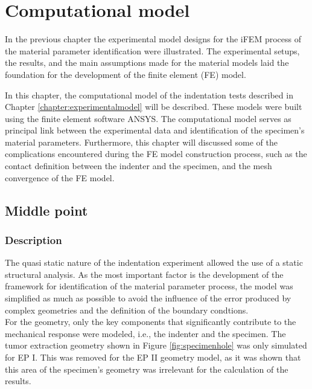 
\chapter{Computational model} %
\label{chapter:computationalmodel} %

In the previous chapter the experimental model designs for the iFEM process of the material 
parameter identification were illustrated. The experimental setups, the results, and the main assumptions 
made for the material models laid the foundation for the development of the finite element (FE) model.

In this chapter, the computational model of the indentation tests described in Chapter \ref{chapter:experimentalmodel} 
will be described. These models were built using the finite element software ANSYS. 
The computational model serves as principal link between the experimental data and identification of the 
specimen's material parameters. Furthermore, this chapter will discussed some of the complications encountered 
during the FE model construction process, such as the contact definition between the indenter and the specimen,
and the mesh convergence of the FE model.

\section{Middle point}
\subsection{Description}
The quasi static nature of the indentation experiment allowed the use of a static 
structural analysis. As the most important factor is the development of the framework for identification 
of the material parameter process, the model was simplified as much as possible to avoid the influence 
of the error produced by complex geometries and the definition of the boundary condtions.\\

For the geometry, only the key components that significantly contribute to the mechanical response were modeled, 
i.e., the indenter and the specimen. The tumor extraction geometry shown in Figure \ref{fig:specimenhole}
was only simulated for EP I. This was removed for the EP II geometry model, as it was shown that this area 
of the specimen's geometry was irrelevant for the calculation of the results.

